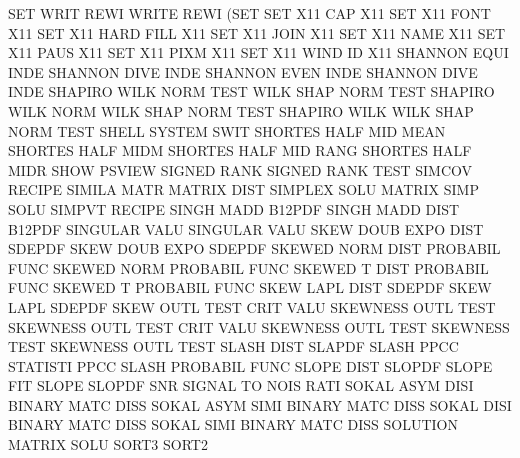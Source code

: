 SET      WRIT REWI                      WRITE    REWI (SET
SET      X11  CAP                       X11
SET      X11  FONT                      X11
SET      X11  HARD FILL                 X11
SET      X11  JOIN                      X11
SET      X11  NAME                      X11
SET      X11  PAUS                      X11
SET      X11  PIXM                      X11
SET      X11  WIND ID                   X11
SHANNON  EQUI INDE                      SHANNON  DIVE INDE
SHANNON  EVEN INDE                      SHANNON  DIVE INDE
SHAPIRO  WILK NORM TEST                 WILK     SHAP NORM TEST
SHAPIRO  WILK NORM                      WILK     SHAP NORM TEST
SHAPIRO  WILK                           WILK     SHAP NORM TEST
SHELL                                   SYSTEM   SWIT
SHORTES  HALF MID  MEAN                 SHORTES  HALF MIDM
SHORTES  HALF MID  RANG                 SHORTES  HALF MIDR
SHOW                                    PSVIEW
SIGNED   RANK                           SIGNED   RANK TEST
SIMCOV                                  RECIPE
SIMILA   MATR                           MATRIX   DIST
SIMPLEX  SOLU                           MATRIX   SIMP SOLU
SIMPVT                                  RECIPE
SINGH    MADD                           B12PDF
SINGH    MADD DIST                      B12PDF
SINGULAR VALU                           SINGULAR VALU
SKEW     DOUB EXPO DIST                 SDEPDF
SKEW     DOUB EXPO                      SDEPDF
SKEWED   NORM DIST                      PROBABIL FUNC
SKEWED   NORM                           PROBABIL FUNC
SKEWED   T    DIST                      PROBABIL FUNC
SKEWED   T                              PROBABIL FUNC
SKEW     LAPL DIST                      SDEPDF
SKEW     LAPL                           SDEPDF
SKEW     OUTL TEST CRIT VALU            SKEWNESS OUTL TEST
SKEWNESS OUTL TEST CRIT VALU            SKEWNESS OUTL TEST
SKEWNESS TEST                           SKEWNESS OUTL TEST
SLASH    DIST                           SLAPDF
SLASH    PPCC                           STATISTI PPCC
SLASH                                   PROBABIL FUNC
SLOPE    DIST                           SLOPDF
SLOPE                                   FIT
SLOPE                                   SLOPDF
SNR                                     SIGNAL   TO   NOIS RATI
SOKAL    ASYM DISI                      BINARY   MATC DISS
SOKAL    ASYM SIMI                      BINARY   MATC DISS
SOKAL    DISI                           BINARY   MATC DISS
SOKAL    SIMI                           BINARY   MATC DISS
SOLUTION                                MATRIX   SOLU
SORT3                                   SORT2
